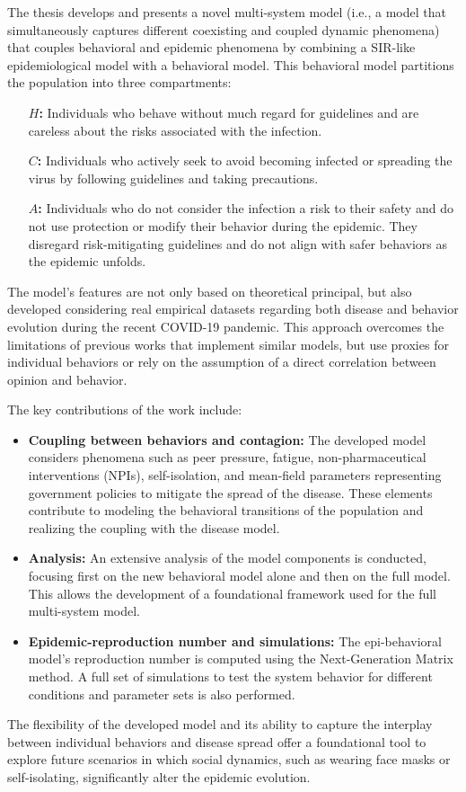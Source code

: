The thesis develops and presents a novel multi-system model (i.e., a model that simultaneously captures different coexisting and coupled dynamic phenomena) that couples behavioral and epidemic phenomena by combining a SIR-like epidemiological model with a behavioral model. This behavioral model partitions the population into three compartments: 
\begin{itemize}
	\item[\textbf{$H$:}] Individuals who behave without much regard for guidelines and are careless about the risks associated with the infection.
	\item[\textbf{$C$:}] Individuals who actively seek to avoid becoming infected or spreading the virus by following guidelines and taking precautions.
	\item[\textbf{$A$:}]Individuals who do not consider the infection a risk to their safety and do not use protection or modify their behavior during the epidemic. They disregard risk-mitigating guidelines and do not align with safer behaviors as the epidemic unfolds.
\end{itemize}

 The model's features are not only based on theoretical principal, but also developed considering real empirical datasets regarding both disease and behavior evolution during the recent COVID-19 pandemic. This approach overcomes the limitations of previous works that implement similar models, but use proxies for individual behaviors or rely on the assumption of a direct correlation between opinion and behavior.

The key contributions of the work include:
\begin{itemize}
	\item \textbf{Coupling between behaviors and contagion:} The developed model considers phenomena such as peer pressure, fatigue, non-pharmaceutical interventions (NPIs), self-isolation, and mean-field parameters representing government policies to mitigate the spread of the disease. These elements contribute to modeling the behavioral transitions of the population and realizing the coupling with the disease model.
	\item \textbf{Analysis:} An extensive analysis of the model components is conducted, focusing first on the new behavioral model alone and then on the full model. This allows the development of a foundational framework used for the full multi-system model.
	\item \textbf{Epidemic-reproduction number and simulations:} The epi-behavioral model's reproduction number is computed using the Next-Generation Matrix method. A full set of simulations to test the system behavior for different conditions and parameter sets is also performed.
\end{itemize}
The flexibility of the developed model and its ability to capture the interplay between individual behaviors and disease spread offer a foundational tool to explore future scenarios in which social dynamics, such as wearing face masks or self-isolating, significantly alter the epidemic evolution.